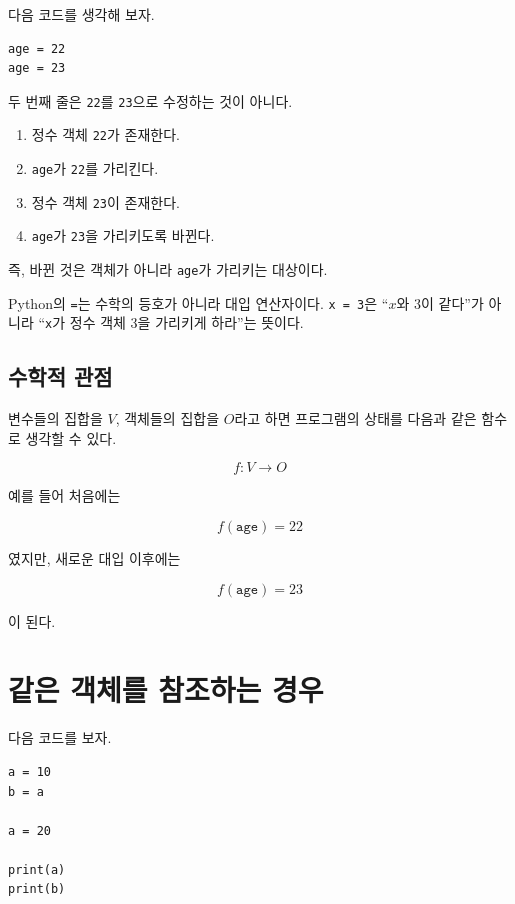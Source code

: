 \documentclass[11pt,a4paper]{article}
\begin{document}
다음 코드를 생각해 보자.

\begin{lstlisting}
age = 22
age = 23
\end{lstlisting}

두 번째 줄은 \texttt{22}를 \texttt{23}으로 수정하는 것이 아니다.

\begin{enumerate}
    \item 정수 객체 \texttt{22}가 존재한다.
    \item \texttt{age}가 \texttt{22}를 가리킨다.
    \item 정수 객체 \texttt{23}이 존재한다.
    \item \texttt{age}가 \texttt{23}을 가리키도록 바뀐다.
\end{enumerate}

즉, 바뀐 것은 객체가 아니라 \texttt{age}가 가리키는 대상이다.

\begin{importantbox}
Python의 \texttt{=}는 수학의 등호가 아니라 대입 연산자이다.
\texttt{x = 3}은 ``\(x\)와 3이 같다''가 아니라 ``\texttt{x}가 정수 객체 3을 가리키게 하라''는 뜻이다.
\end{importantbox}

\subsection{수학적 관점}

변수들의 집합을 \(V\), 객체들의 집합을 \(O\)라고 하면 프로그램의 상태를 다음과 같은 함수로 생각할 수 있다.

\[
f:V\rightarrow O
\]

예를 들어 처음에는

\[
f(\texttt{age})=22
\]

였지만, 새로운 대입 이후에는

\[
f(\texttt{age})=23
\]

이 된다.

\section{같은 객체를 참조하는 경우}

다음 코드를 보자.

\begin{lstlisting}
a = 10
b = a

a = 20

print(a)
print(b)
\end{lstlisting}
\end{document}
